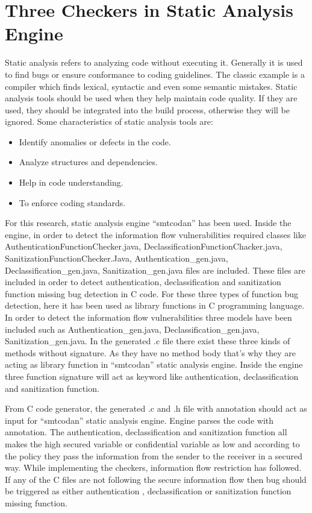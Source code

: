 \section{Three Checkers in Static Analysis Engine}
Static analysis refers to analyzing code without executing it. Generally it is used to find bugs or ensure conformance to coding guidelines. The classic example is a compiler which finds lexical, syntactic and even some semantic mistakes. Static analysis tools should be used when they help maintain code quality. If they are used, they should be integrated into the build process, otherwise they will be ignored. Some characteristics of static analysis tools are:
\begin{itemize}	
	\item Identify anomalies or defects in the code.
	\item Analyze structures and dependencies.
	\item Help in code understanding.
	\item To enforce coding standards.
\end{itemize}

For this research, static analysis engine \enquote{smtcodan}  has been used. Inside the engine, in order to detect the information flow vulnerabilities required classes like AuthenticationFunctionChecker.java, DeclassificationFunctionChacker.java, SanitizationFunctionChecker.Java, Authentication\_gen.java,\\
Declassification\_gen.java,
Sanitization\_gen.java files are included. These files are included in order to detect authentication, declassification and sanitization function missing bug detection in C code. For these three types of function bug detection, here it has been used as library functions in C programming language. In order to detect the information flow vulnerabilities three models have been included such as Authentication\_gen.java,
Declassification\_gen.java,
Sanitization\_gen.java. In the generated .c file there exist these three kinds of methods without signature. As they have no method body that's why they are acting as library function in \enquote{smtcodan} static analysis engine. Inside the engine three function signature will act as keyword like authentication, declassification and sanitization function.

From C code generator, the generated .c and .h file with annotation should act as input for \enquote{smtcodan} static analysis engine. Engine parses the code with annotation. The authentication, declassification and sanitization function all makes the high secured variable or confidential variable as low and according to the policy they pass the information from the sender to the receiver in a secured way. While implementing the checkers, information flow restriction has followed. If any of the C files are not following the secure information flow then bug should be triggered as either authentication , declassification or sanitization function missing function.

